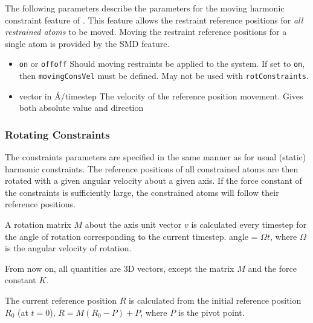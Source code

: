 The following parameters describe the parameters for the
moving harmonic constraint feature of \NAMD.
This feature allows the restraint reference positions
for {\em all restrained atoms} to be moved.
Moving the restraint reference positions for a single atom
is provided by the SMD feature.

\begin{itemize}

\item
{}
{{\tt on} or {\tt off}}{{\tt off}}
{Should moving restraints be applied to the system. If set
to {\tt on}, then  {\tt movingConsVel} must be defined.
May not be used with {\tt rotConstraints}.}

\item
{}
{vector in \AA/timestep}
{The velocity of the reference position movement. Gives both absolute
value and direction}

\end{itemize}

\subsubsection{Rotating Constraints}

The constraints parameters are specified in the same manner as for
usual (static) harmonic constraints. The reference positions of all
constrained atoms are then rotated with a given angular velocity
about a given axis. If the force constant of the constraints is
sufficiently
large, the constrained atoms will follow their reference positions.

A rotation matrix $M$ about the axis unit vector $v$ is calculated every
timestep
for the angle of rotation corresponding to the current timestep.
    angle = $\Omega t$,
where $\Omega$ is the angular velocity of rotation.

From now on, all quantities are 3D vectors, except the matrix $M$ and the
force constant $K$.

The current reference position $R$ is calculated from the initial
reference
position $R_0$ (at $t=0$),
    $R = M (R_0 - P) + P$,
where $P$ is the pivot point.

%
%
%

